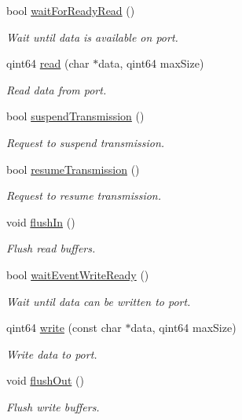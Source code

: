 \begin{DoxyCompactItemize}
bool \hyperlink{classmdt_serial_port_a0334aa073299f6161034e6be7c60939d}{waitForReadyRead} ()
\begin{DoxyCompactList}\small\item\em Wait until data is available on port. \end{DoxyCompactList}\item 
qint64 \hyperlink{classmdt_serial_port_a12274d7956b2af961ccdd36cfc2052cc}{read} (char $\ast$data, qint64 maxSize)
\begin{DoxyCompactList}\small\item\em Read data from port. \end{DoxyCompactList}\item 
bool \hyperlink{classmdt_serial_port_a9412faf413eca5ee3516139fdfaaf2fe}{suspendTransmission} ()
\begin{DoxyCompactList}\small\item\em Request to suspend transmission. \end{DoxyCompactList}\item 
bool \hyperlink{classmdt_serial_port_a02fd5ee74a7f52c3bce0545ec8a659bf}{resumeTransmission} ()
\begin{DoxyCompactList}\small\item\em Request to resume transmission. \end{DoxyCompactList}\item 
void \hyperlink{classmdt_serial_port_a597d013bbe18b1f946b99f68a4856a87}{flushIn} ()
\begin{DoxyCompactList}\small\item\em Flush read buffers. \end{DoxyCompactList}\item 
bool \hyperlink{classmdt_serial_port_a815275951e5834daf5068ffb48fcdcb3}{waitEventWriteReady} ()
\begin{DoxyCompactList}\small\item\em Wait until data can be written to port. \end{DoxyCompactList}\item 
qint64 \hyperlink{classmdt_serial_port_a282f99035c032fbb6fa86ccd10deb597}{write} (const char $\ast$data, qint64 maxSize)
\begin{DoxyCompactList}\small\item\em Write data to port. \end{DoxyCompactList}\item 
void \hyperlink{classmdt_serial_port_a3a446c34c9f98e0c14637ab3dcab98d0}{flushOut} ()
\begin{DoxyCompactList}\small\item\em Flush write buffers. \end{DoxyCompactList}\item 

\end{DoxyCompactItemize}
